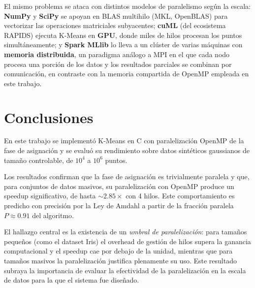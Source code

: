 \documentclass[conference]{IEEEtran}
\begin{document}
El mismo problema se ataca con distintos modelos de paralelismo seg\'un la
escala: \textbf{NumPy} y \textbf{SciPy} se apoyan en BLAS multihilo (MKL,
OpenBLAS) para vectorizar las operaciones matriciales subyacentes;
\textbf{cuML} (del ecosistema RAPIDS) ejecuta K-Means en \textbf{GPU}, donde
miles de hilos procesan los puntos simult\'aneamente; y \textbf{Spark MLlib}
lo lleva a un cl\'uster de varias m\'aquinas con \textbf{memoria distribuida},
un paradigma an\'alogo a MPI en el que cada nodo procesa una porci\'on de los
datos y los resultados parciales se combinan por comunicaci\'on, en contraste
con la memoria compartida de OpenMP empleada en este trabajo.

\section{Conclusiones}
\label{sec:conclusiones}

En este trabajo se implement\'o K-Means en C con paralelizaci\'on OpenMP de
la fase de asignaci\'on y se evalu\'o su rendimiento sobre datos sint\'eticos
gaussianos de tama\~no controlable, de $10^4$ a $10^6$ puntos.

Los resultados confirman que la fase de asignaci\'on es trivialmente paralela
y que, para conjuntos de datos masivos, su paralelizaci\'on con OpenMP produce
un speedup significativo, de hasta $\sim 2.85\times$ con 4 hilos.
Este comportamiento es predicho con precisi\'on por la Ley de Amdahl a partir
de la fracci\'on paralela $P \approx 0.91$ del algoritmo.

El hallazgo central es la existencia de un \emph{umbral de paralelizaci\'on}:
para tama\~nos peque\~nos (como el dataset Iris) el overhead de gesti\'on de
hilos supera la ganancia computacional y el speedup cae por debajo de la
unidad, mientras que para tama\~nos masivos la paralelizaci\'on justifica
plenamente su uso.
Este resultado subraya la importancia de evaluar la efectividad de la
paralelizaci\'on en la escala de datos para la que el sistema fue dise\~nado.



\end{document}
